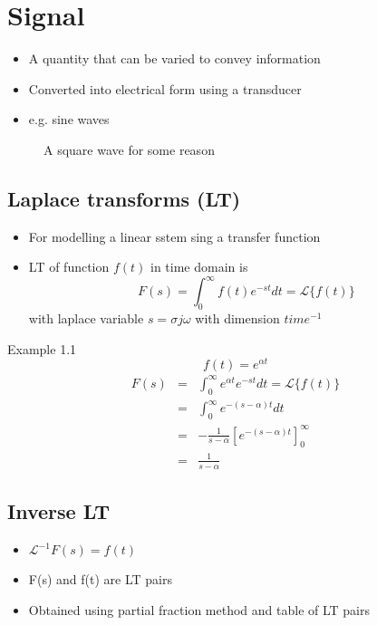 \documentclass[11pt]{article} %
\begin{document}
\section{Signal}
	\begin{itemize}
	\item A quantity that can be varied to convey information
	\item Converted into electrical form using a transducer
	\item e.g. sine waves
		
	\end{itemize}

	\begin{figure}[h]
		\centering
		\caption{A square wave for some reason}
	\end{figure}

\subsection{Laplace transforms (LT)}
	\begin{itemize}
	\item For modelling a linear sstem sing a transfer function
	\item LT of function $f(t)$ in time domain is
		\begin{equation}
			F(s) = \int^\infty _0 f(t)e^{-st}dt =\mathcal{L}\{f(t)\}
		\end{equation}
		with laplace variable $s = \sigma j\omega$ with dimension $time^{-1}$
	\end{itemize}

	Example 1.1
	\begin{equation}
		f(t) =  e^{\alpha t} 
	\end{equation}
	\begin{eqnarray}
		F(s) &=& \int^\infty_0 e^{\alpha t} e^{-st} dt = \mathcal{L}\{f(t)\} \nonumber \\
		&=& \int^\infty_0 e^{-(s-\alpha)t} dt \nonumber \\
		&=& -\frac{1}{s-\alpha}\left[{e^{-(s-\alpha)t}}\right]_0^\infty \nonumber \\
		&=& \frac{1}{s-\alpha}
	\end{eqnarray}

\subsection{Inverse LT}
	\begin{itemize}
		\item $\mathcal{L}^{-1} F(s)=f(t)$
		\item F(s) and  f(t) are LT pairs
		\item Obtained using partial fraction method and table of LT pairs
	\end{itemize}
\end{document}
